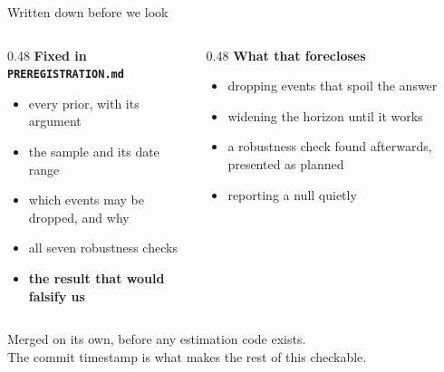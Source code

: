 \documentclass[aspectratio=169,11pt]{beamer}
\newcommand{\lead}[1]{{\color{accent}\bfseries #1}}
\begin{document}
\begin{frame}{Written down before we look}
\vspace{0.5em}
\begin{columns}[T,onlytextwidth]
\begin{column}{0.48\textwidth}
{\color{accent}\bfseries Fixed in \texttt{PREREGISTRATION.md}}
\vspace{0.5em}
\begin{itemize}\setlength\itemsep{0.35em}\small
\item every prior, with its argument
\item the sample and its date range
\item which events may be dropped, and why
\item all seven robustness checks
\item \lead{the result that would falsify us}
\end{itemize}
\end{column}
\begin{column}{0.48\textwidth}
{\color{warn}\bfseries What that forecloses}
\vspace{0.5em}
\begin{itemize}\setlength\itemsep{0.35em}\small
\item dropping events that spoil the answer
\item widening the horizon until it works
\item a robustness check found afterwards, presented as planned
\item reporting a null quietly
\end{itemize}
\end{column}
\end{columns}
\vspace{1.0em}
\begin{center}
{\color{muted}Merged on its own, before any estimation code exists.\\
The commit timestamp is what makes the rest of this checkable.}
\end{center}
\end{frame}
\end{document}

